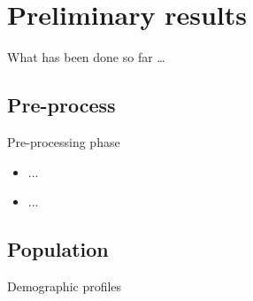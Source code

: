 \documentclass[12pt]{beamer}
\begin{document}
\section{Preliminary results}


\begin{frame}
	\centerline{\Huge\textcolor{bscuro}{What has been done so far \ldots}}		
\end{frame}


\subsection{Pre-process}


\begin{frame}{\textcolor{bscuro}{Pre-processing phase}}
	\begin{itemize}
		\item ...
		\item ...
	\end{itemize}
\end{frame}


\subsection{Population}


\begin{frame}{\textcolor{bscuro}{Demographic profiles}}
	\begin{figure}[!ht] 
		\centering

	\end{figure}
\end{frame}
\end{document}
